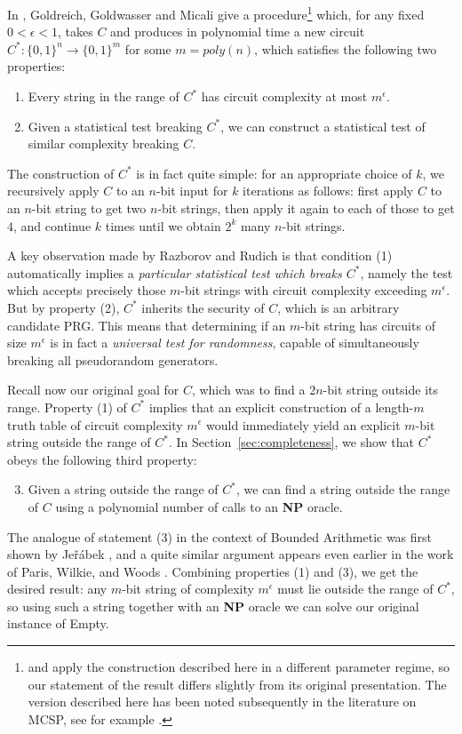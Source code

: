 \documentclass[11pt]{article}
\def\cl{\bf}
\begin{document}
In \cite{GGM}, Goldreich, Goldwasser and Micali give a procedure\footnote{\cite{GGM} and \cite{natural-proofs} apply the construction described here in a different parameter regime, so our statement of the result differs slightly from its original presentation. The version described here has been noted subsequently in the literature on {\sc MCSP}, see for example \cite{MCSP-OWF}.} which, for any fixed $0 < \epsilon < 1$, takes $C$ and produces in polynomial time a new circuit $C^*: \{0,1\}^n \rightarrow \{0,1\}^{m}$ for some $m = poly(n)$, which satisfies the following two properties:
\begin{enumerate}[(1)]
    \item Every string in the range of $C^*$ has circuit complexity at most $m^{\epsilon}$.
    \item Given a statistical test breaking $C^*$, we can construct a statistical test of similar complexity breaking $C$.
\end{enumerate}
The construction of $C^*$ is in fact quite simple: for an appropriate choice of $k$, we recursively apply $C$ to an $n$-bit input for $k$ iterations as follows: first apply $C$ to an $n$-bit string to get two $n$-bit strings, then apply it again to each of those to get $4$, and continue $k$ times until we obtain $2^k$ many $n$-bit strings. 

A key observation made by Razborov and Rudich \cite{natural-proofs} is that condition (1) automatically implies a \emph{particular statistical test which breaks $C^*$}, namely the test which accepts precisely those $m$-bit strings with circuit complexity exceeding $m^{\epsilon}$. But by property (2), $C^*$ inherits the security of $C$, which is an arbitrary candidate PRG. This means that determining if an $m$-bit string has circuits of size $m^{\epsilon}$ is in fact a \emph{universal test for randomness}, capable of simultaneously breaking all pseudorandom generators.

Recall now our original goal for $C$, which was to find a $2n$-bit string outside its range. Property (1) of $C^*$ implies that an explicit construction of a length-$m$ truth table of circuit complexity $m^{\epsilon}$ would immediately yield an explicit $m$-bit string outside the range of $C^*$. In Section~\ref{sec:completeness}, we show that $C^*$ obeys the following third property:
\begin{enumerate}[(1)]
    \setcounter{enumi}{2}
    \item Given a string outside the range of $C^*$, we can find a string outside the range of $C$ using a polynomial number of calls to an {\cl NP} oracle.
\end{enumerate}
The analogue of statement (3) in the context of Bounded Arithmetic was first shown by Je\v{r}\'{a}bek \cite{Jerabek}, and a quite similar argument appears even earlier in the work of Paris, Wilkie, and Woods \cite{Paris-Wilkie-Woods}. Combining properties (1) and (3), we get the desired result: any $m$-bit string of complexity $m^{\epsilon}$ must lie outside the range of $C^*$, so using such a string together with an {\cl NP} oracle we can solve our original instance of {\sc Empty}.
\end{document}
